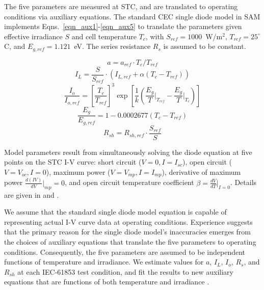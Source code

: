 \documentclass[12pt,letterpaper]{article}
\begin{document}
The five parameters are measured at STC, and are translated to operating conditions via auxiliary equations.  The standard CEC single diode model in SAM implements Eqns.~\ref{eqn_aux1}-\ref{eqn_aux5} to translate the parameters given effective irradiance $S$ and cell temperature $T_c$, with $S_{ref}=1000$~W/m$^2$, $T_{ref}=25^\circ$C, and $E_{g,ref} = 1.121$~eV.  The series resistance $R_s$ is assumed to be constant.

\begin{equation}\label{eqn_aux1} a = a_{ref}\cdot T_c / T_{ref} \end{equation}
\begin{equation}\label{eqn_aux2} I_L = \frac{S}{S_{ref}}\cdot(I_{L,ref} + \alpha(T_c-T_{ref})) \end{equation}
\begin{equation}\label{eqn_aux3}
\frac{I_o}{I_{o,ref}} = \left[ \frac{T_{c}}{T_{ref}} \right] ^ 3 \exp \left[ \frac{1}{k} \left( \frac{E_g}{T}\Bigg|_{T_{ref}} - \frac{E_g}{T}\Bigg|_{T_{c}} \right) \right]
\end{equation}
\begin{equation}\label{eqn_aux4}
\frac{E_g}{E_{g,ref}} = 1 - 0.0002677(T_{c} - T_{ref})
\end{equation}
\begin{equation}\label{eqn_aux5}
R_{sh} = R_{sh,ref}\cdot\frac{S_{ref}}{S}
\end{equation}

Model parameters result from simultaneously solving the diode equation at five points on the STC I-V curve: short circuit ($V=0, I=I_{sc}$), open circuit ($V=V_{oc}, I=0$), maximum power ($V=V_{mp}, I=I_{mp}$), derivative of maximum power $\frac{d(IV)}{dV}|_{mp}=0$, and open circuit temperature coefficient $\beta = \frac{dV}{dT}|_{I=0}$.  Details are given in \cite{desoto2004a} and \cite{dobos2012a}.

We assume that the standard single diode model equation is capable of representing actual I-V curve data at operating conditions.  Experience suggests that the primary reason for the single diode model's inaccuracies emerges from the choices of auxiliary equations that translate the five parameters to operating conditions.  Consequently, the five parameters are assumed to be independent functions of temperature and irradiance.  We estimate values for $a$, $I_L$, $I_o$, $R_s$, and $R_{sh}$ at each IEC-61853 test condition, and fit the results to new auxiliary equations that are functions of both temperature and irradiance .
\end{document}
